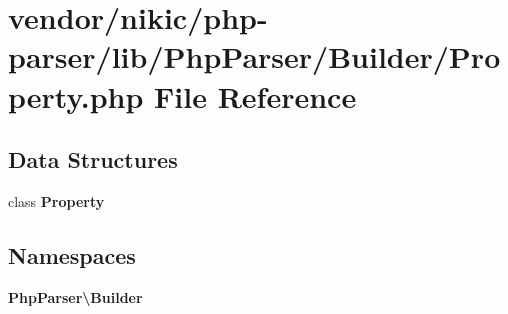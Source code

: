 \section{vendor/nikic/php-\/parser/lib/\+Php\+Parser/\+Builder/\+Property.php File Reference}
\label{_builder_2_property_8php}
\subsection*{Data Structures}
\begin{DoxyCompactItemize}
\item 
class {\bf Property}
\end{DoxyCompactItemize}
\subsection*{Namespaces}
\begin{DoxyCompactItemize}
\item 
 {\bf Php\+Parser\textbackslash{}\+Builder}
\end{DoxyCompactItemize}
